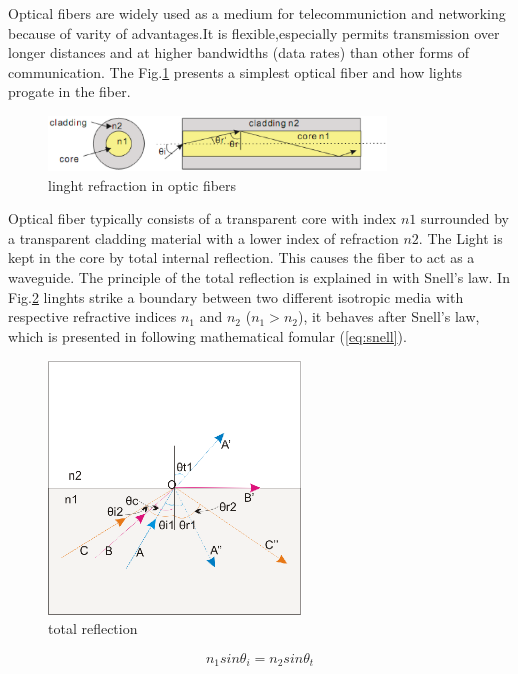 Optical fibers are widely used as a medium for telecommuniction and networking because of varity of advantages.It is flexible,especially permits transmission over longer distances and at higher bandwidths (data rates) than other forms of communication. The Fig.\ref{fig:opticfiber} presents a simplest optical fiber and how lights progate in the fiber. 

\begin{figure}[httbp]
\centering
\includegraphics[width=0.8\textwidth]{bilder/opticfiber}
\caption{linght refraction in optic fibers}
\label{fig:opticfiber}
\end{figure}

Optical fiber typically consists of a transparent core with index $n1$ surrounded by a transparent cladding material with a lower index of refraction $n2$. The Light is kept in the core by total internal reflection. This causes the fiber to act as a waveguide.
The principle of the total reflection is explained in \cite{script_FT_TET} with Snell's law. In Fig.\ref{fig:totalreflection} linghts strike a boundary between two different isotropic media with respective refractive indices $n_{1}$ and $n_{2}$ ($n_{1}>n_{2}$), it behaves after Snell's law, which is presented in following mathematical fomular (\ref{eq:snell}).
\begin{figure}[httbp]
\centering
\includegraphics[width=0.6\textwidth]{bilder/totalreflection}
\caption{total reflection}
\label{fig:totalreflection}
\end{figure}

\begin{equation}
n_{1}sin\theta_{i}=n_{2}sin\theta_{t}
\label{eq:snell}
\end{equation}

